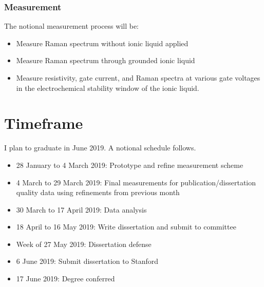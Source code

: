 \documentclass[11pt]{article}
\begin{document}
\subsubsection{Measurement}

The notional measurement process will be:

\begin{itemize}
	\item Measure Raman spectrum without ionic liquid applied
	\item Measure Raman spectrum through grounded ionic liquid
	\item Measure \rucl resistivity, gate current, and Raman spectra at various gate voltages in the electrochemical stability window of the ionic liquid. 
\end{itemize}

\section{Timeframe}
I plan to graduate in June 2019. A notional schedule follows.

\begin{itemize}
	\item 28 January to 4 March 2019: Prototype and refine measurement scheme
	\item 4 March to 29 March 2019: Final measurements for publication/dissertation quality data using refinements from previous month
	\item 30 March to 17 April 2019: Data analysis
	\item 18 April to 16 May 2019: Write dissertation and submit to committee
	\item Week of 27 May 2019: Dissertation defense
	\item 6 June 2019: Submit dissertation to Stanford
	\item 17 June 2019: Degree conferred	
\end{itemize}



\end{document}
